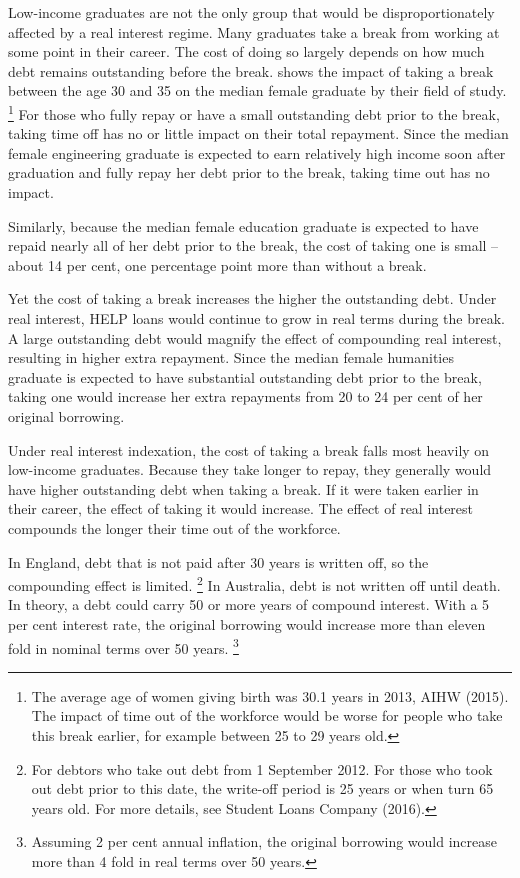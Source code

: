 \documentclass[embargoed]{grattan}
\begin{document}
Low-income graduates are not the only group that would be disproportionately affected by a real interest regime.
Many graduates take a break from working at some point in their career.
The cost of doing so largely depends on how much debt remains outstanding before the break.
 shows the impact of taking a break between the age 30 and 35 on the median female graduate by their field of study.%
\footnote{The average age of women giving birth was 30.1 years in 2013, AIHW (2015).
The impact of time out of the workforce would be worse for people who take this break earlier, for example between 25 to 29 years old.} For those who fully repay or have a small outstanding debt prior to the break, taking time off has no or little impact on their total repayment.
Since the median female engineering graduate is expected to earn relatively high income soon after graduation and fully repay her debt prior to the break, taking time out has no impact.

Similarly, because the median female education graduate is expected to have repaid nearly all of her debt prior to the break, the cost of taking one is small -- about 14 per cent, one percentage point more than without a break.

Yet the cost of taking a break increases the higher the outstanding debt.
Under real interest, \gls{HELP} loans would continue to grow in real terms during the break.
A large outstanding debt would magnify the effect of compounding real interest, resulting in higher extra repayment.
Since the median female humanities graduate is expected to have substantial outstanding debt prior to the break, taking one would increase her extra repayments from 20 to 24 per cent of her original borrowing.

Under real interest indexation, the cost of taking a break falls most heavily on low-income graduates.
Because they take longer to repay, they generally would have higher outstanding debt when taking a break.
If it were taken earlier in their career, the effect of taking it would increase.
The effect of real interest compounds the longer their time out of the workforce.

In England, debt that is not paid after 30 years is written off, so the compounding effect is limited.%
\footnote{For debtors who take out debt from 1 September 2012.
For those who took out debt prior to this date, the write-off period is 25 years or when turn 65 years old.
For more details, see Student Loans Company (2016).} In Australia, debt is not written off until death.
In theory, a debt could carry 50 or more years of compound interest.
With a 5 per cent interest rate, the original borrowing would increase more than eleven fold in nominal terms over 50 years.%
\footnote{Assuming 2 per cent annual inflation, the original borrowing would increase more than 4 fold in real terms over 50 years.}
\end{document}
